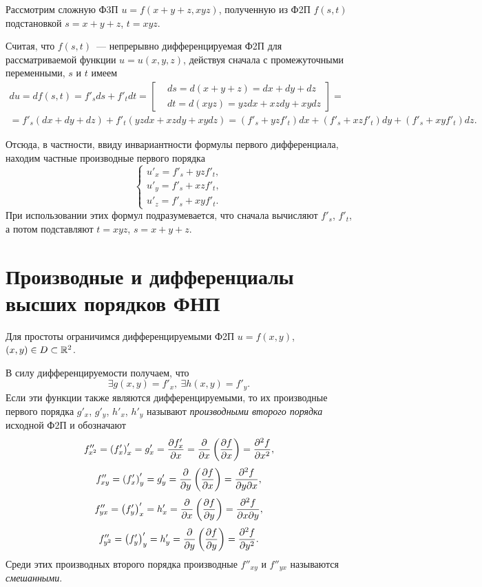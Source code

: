 \documentclass[../../main.tex]{subfiles}
\begin{document}
	\begin{exmp}
		Рассмотрим сложную Ф3П $u=f(x+y+z,xyz)$, полученную из Ф2П $f(s,t)$ 
		подстановкой $s=x+y+z$, $t=xyz$.
		
		Считая, что $f(s,t)$~--- непрерывно дифференцируемая 
		Ф2П для рассматриваемой 
		функции $u=u(x,y,z)$, действуя сначала с 
		промежуточными переменными, $s$ и $t$ имеем
		\begin{gather*}
			du = df(s,t) = f'_sds + f'_tdt = \left[\begin{aligned}
				& ds = d(x + y + z) = dx + dy + dz\\
				& dt = d(xyz) = yzdx + xzdy + xydz
			\end{aligned}\right] = \\
			= f'_s\left(dx + dy + dz\right) + 
			f'_t\left(yzdx + xzdy + xydz\right) = 
			\left(f'_s + yzf'_t\right)dx + 
			\left(f'_s + xzf'_t\right)dy + 
			\left(f'_s + xyf'_t\right)dz.
		\end{gather*}
		
		Отсюда, в частности, ввиду инвариантности формулы первого 
		дифференциала, находим частные производные первого порядка
		\[\begin{cases}
			u'_x = f'_s + yzf'_t,\\
			u'_y = f'_s + xzf'_t,\\
			u'_z = f'_s + xyf'_t.
		\end{cases}\]
		При использовании этих формул подразумевается, что сначала 
		вычисляют $f'_s$, $f'_t$, а потом подставляют 
		$t = xyz$, $s = x + y + z$.
	\end{exmp}

	\section{Производные и дифференциалы высших порядков ФНП}
	
	Для простоты ограничимся дифференцируемыми Ф2П $u=f(x,y)$, $(x,y)\in 
	D\subset \mathbb{R}^2$.
	
	В силу дифференцируемости получаем, что
	\[\exists g(x,y) = f'_x,\ \exists h(x,y) = f'_y.\]
	Если эти функции также являются дифференцируемыми, то их производные 
	первого порядка $g'_x$, $g'_y$, $h'_x$, $h'_y$ называют \emph{производными 
	второго порядка} исходной Ф2П и обозначают 
	\[f''_{x^2} = \left(f'_x\right)'_x = g'_x = \frac{\partial f'_x}{\partial x} =
	 \frac{\partial }{\partial x}\left(\frac{\partial f}{\partial x}\right) = \frac{\partial ^2f}{\partial x^2},\]
	\[f''_{xy} = \left(f'_x\right)'_y = g'_y = 
	\frac{\partial }{\partial y}\left(\frac{\partial f}{\partial x}\right) = \frac{\partial ^2f}{\partial y\partial x},\]
	\[f''_{yx} = \left(f'_y\right)'_x = h'_x = 
	\frac{\partial }{\partial x}\left(\frac{\partial f}{\partial y}\right) = \frac{\partial ^2f}{\partial x\partial y},\]
	\[f''_{y^2} = \left(f'_y\right)'_y = h'_y = 
	\frac{\partial }{\partial y}\left(\frac{\partial f}{\partial y}\right) = \frac{\partial ^2f}{\partial y^2}.\]
	Среди этих производных второго порядка производные $f''_{xy}$ и 
	$f''_{yx}$ называются \emph{смешанными}.
	
\end{document}
